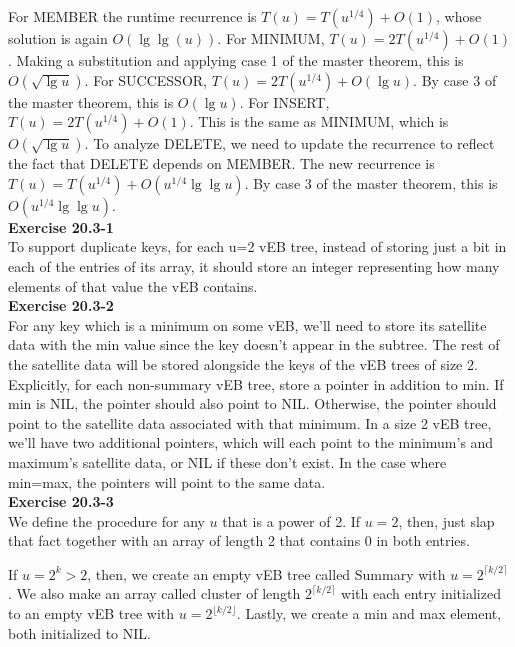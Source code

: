 \documentclass{article}
\begin{document}
For MEMBER the runtime recurrence is $T(u) = T(u^{1/4}) + O(1)$, whose solution is again $O(\lg\lg(u))$.  For MINIMUM, $T(u) = 2T(u^{1/4}) + O(1)$. Making a substitution and applying case 1 of the master theorem, this is $O(\sqrt{\lg u})$.  For SUCCESSOR, $T(u) = 2T(u^{1/4}) + O(\lg u)$.  By case 3 of the master theorem, this is $O(\lg u)$.  For INSERT, $T(u) = 2T(u^{1/4}) + O(1)$.  This is the same as MINIMUM, which is $O(\sqrt{\lg u})$.  To analyze DELETE, we need to update the recurrence to reflect the fact that DELETE depends on MEMBER.  The new recurrence is $T(u) = T(u^{1/4}) + O(u^{1/4}\lg \lg u)$.  By case 3 of the master theorem, this is $O(u^{1/4}\lg \lg u)$. \\

\noindent\textbf{Exercise 20.3-1}\\

To support duplicate keys, for each u=2 vEB tree, instead of storing just a bit in each of the entries of its array, it should store an integer representing how many elements of that value the vEB contains.\\

\noindent\textbf{Exercise 20.3-2}\\

For any key which is a minimum on some vEB, we'll need to store its satellite data with the min value since the key doesn't appear in the subtree.  The rest of the satellite data will be stored alongside the keys of the vEB trees of size 2.  Explicitly, for each non-summary vEB tree, store a pointer in addition to min.  If min is NIL, the pointer should also point to NIL.  Otherwise, the pointer should point to the satellite data associated with that minimum.  In a size 2 vEB tree, we'll have two additional pointers, which will each point to the minimum's and maximum's satellite data, or NIL if these don't exist.  In the case where min=max, the pointers will point to the same data. \\

\noindent\textbf{Exercise 20.3-3}\\

We define the procedure for any $u$ that is a power of 2. If $u=2$, then, just slap that fact together with an array of length 2 that contains 0 in both entries. 

If $u = 2^k > 2$, then, we create an empty vEB tree called Summary with $u= 2^{\lceil k/2\rceil}$. We also make an array called cluster of length $2^{\lceil k/2\rceil}$ with each entry initialized to an empty vEB tree with $u = 2^{\lfloor k/2\rfloor}$. Lastly, we create a min and max element, both initialized to NIL.\\
\end{document}
